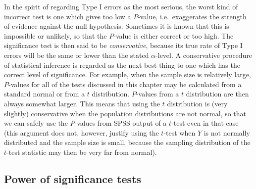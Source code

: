 In the spirit of regarding Type I errors as the most serious, the worst
kind of incorrect test is one which gives too low a $P$-value, i.e.\
exaggerates the strength of evidence against the null hypothesis.
Sometimes it is known that this is impossible or unlikely, so that the
$P$-value is either correct or too high. The significance test is then
said to be \emph{conservative}, because its true rate of Type I errors
will be the same or lower than the stated $\alpha$-level. A conservative
procedure of statistical inference is regarded as the next best thing to
one which has the correct level of significance. For example, when the
sample size is relatively large, $P$-values for all of the tests
discussed in this chapter may be calculated from a standard normal or
from a $t$ distribution. $P$-values from a $t$ distribution are then
always somewhat larger. This means that using the $t$ distribution is
(very slightly) conservative when the population distributions are not
normal, so that we can safely use the $P$-values from SPSS output of a
$t$-test even in that case (this argument does not, however, justify
using the $t$-test when $Y$ is not normally distributed and the sample
size is small, because the sampling distribution of the $t$-test
statistic may then be very far from normal).

\subsection{Power of significance tests}
\label{ss_means_tests3_power}

